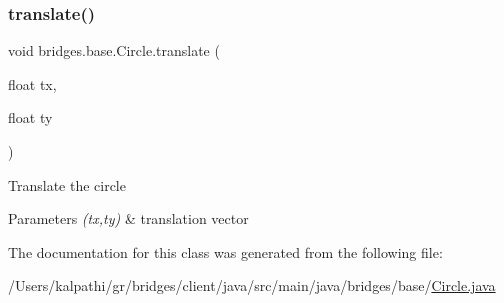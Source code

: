 \subsubsection{\texorpdfstring{translate()}{translate()}}
{\footnotesize\ttfamily void bridges.\+base.\+Circle.\+translate (\begin{DoxyParamCaption}\item[{float}]{tx,  }\item[{float}]{ty }\end{DoxyParamCaption})}

Translate the circle


\begin{DoxyParams}{Parameters}
{\em (tx,ty)} & translation vector \\
\hline
\end{DoxyParams}


The documentation for this class was generated from the following file\+:\begin{DoxyCompactItemize}
\item 
/\+Users/kalpathi/gr/bridges/client/java/src/main/java/bridges/base/\mbox{\hyperlink{_circle_8java}{Circle.\+java}}\end{DoxyCompactItemize}

